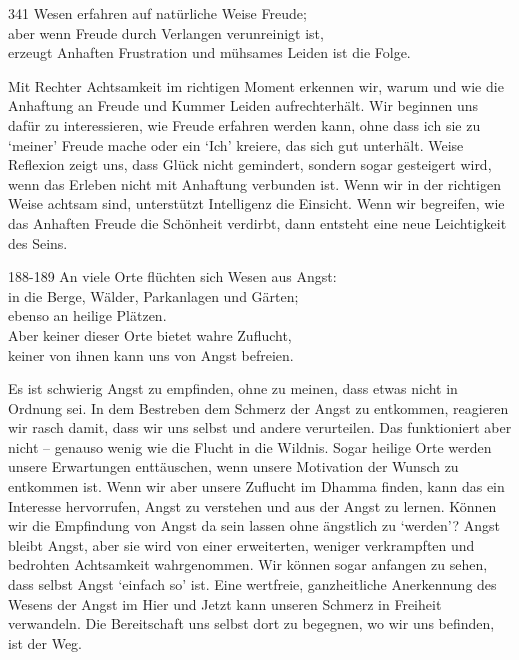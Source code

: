 
\begin{dhpVerse}{341}
\label{dhp-341}
Wesen erfahren auf natürliche Weise Freude;\\ 
aber wenn Freude durch Verlangen verunreinigt ist,\\ 
erzeugt Anhaften Frustration und mühsames Leiden ist die Folge. 
\end{dhpVerse}

\begin{dhpRefl}

Mit Rechter Achtsamkeit im richtigen Moment erkennen wir, warum und wie die
Anhaftung an Freude und Kummer Leiden aufrechterhält. Wir beginnen uns dafür
zu interessieren, wie Freude erfahren werden kann, ohne dass ich sie zu
`meiner' Freude mache oder ein `Ich' kreiere, das sich gut unterhält. Weise
Reflexion zeigt uns, dass Glück nicht gemindert, sondern sogar gesteigert
wird, wenn das Erleben nicht mit Anhaftung verbunden ist. Wenn wir in der
richtigen Weise achtsam sind, unterstützt Intelligenz die Einsicht. Wenn wir
begreifen, wie das Anhaften Freude die Schönheit verdirbt, dann entsteht eine
neue Leichtigkeit des Seins.

\end{dhpRefl}


\begin{dhpVerse}{188-189}
\label{dhp-188}\label{dhp-189}
An viele Orte flüchten sich Wesen aus Angst:\\ 
in die Berge, Wälder, Parkanlagen und Gärten;\\ 
ebenso an heilige Plätzen.\\ 
Aber keiner dieser Orte bietet wahre Zuflucht,\\ 
keiner von ihnen kann uns von Angst befreien. 
\end{dhpVerse}

\begin{dhpRefl}

Es ist schwierig Angst zu empfinden, ohne zu meinen, dass etwas nicht in
Ordnung sei. In dem Bestreben dem Schmerz der Angst zu entkommen, reagieren
wir rasch damit, dass wir uns selbst und andere verurteilen. Das funktioniert
aber nicht -- genauso wenig wie die Flucht in die Wildnis. Sogar heilige Orte
werden unsere Erwartungen enttäuschen, wenn unsere Motivation der Wunsch zu
entkommen ist. Wenn wir aber unsere Zuflucht im Dhamma finden, kann das ein
Interesse hervorrufen, Angst zu verstehen und aus der Angst zu lernen. Können
wir die Empfindung von Angst da sein lassen ohne ängstlich zu `werden'? Angst
bleibt Angst, aber sie wird von einer erweiterten, weniger verkrampften und
bedrohten Achtsamkeit wahrgenommen. Wir können sogar anfangen zu sehen, dass
selbst Angst `einfach so' ist. Eine wertfreie, ganzheitliche Anerkennung des
Wesens der Angst im Hier und Jetzt kann unseren Schmerz in Freiheit
verwandeln. Die Bereitschaft uns selbst dort zu begegnen, wo wir uns befinden,
ist der Weg.

\end{dhpRefl}

